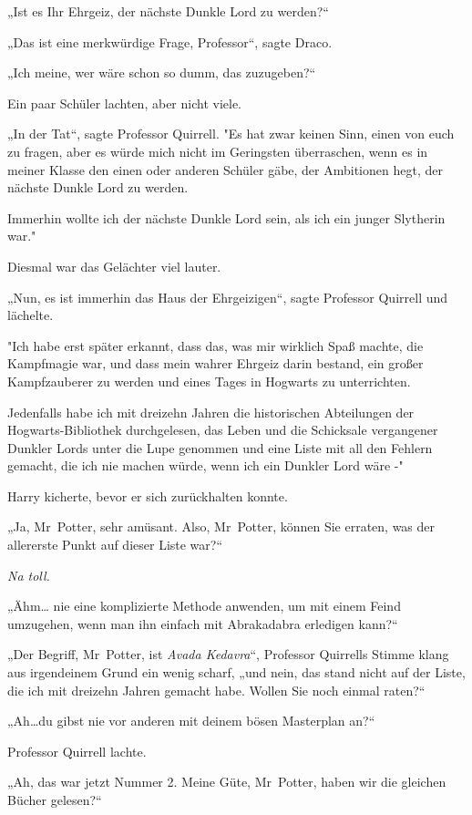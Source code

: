 {„Ist es Ihr Ehrgeiz, der nächste Dunkle Lord zu werden?“

„Das ist eine merkwürdige Frage, Professor“, sagte Draco.

„Ich meine, wer wäre schon so dumm, das zuzugeben?“

Ein paar Schüler lachten, aber nicht viele.

„In der Tat“, sagte Professor Quirrell. "Es hat zwar keinen Sinn, einen von euch zu fragen, aber es würde mich nicht im Geringsten überraschen, wenn es in meiner Klasse den einen oder anderen Schüler gäbe, der Ambitionen hegt, der nächste Dunkle Lord zu werden.

Immerhin wollte ich der nächste Dunkle Lord sein, als ich ein junger Slytherin war."

Diesmal war das Gelächter viel lauter.

„Nun, es ist immerhin das Haus der Ehrgeizigen“, sagte Professor Quirrell und lächelte.

"Ich habe erst später erkannt, dass das, was mir wirklich Spaß machte, die Kampfmagie war, und dass mein wahrer Ehrgeiz darin bestand, ein großer Kampfzauberer zu werden und eines Tages in Hogwarts zu unterrichten.

Jedenfalls habe ich mit dreizehn Jahren die historischen Abteilungen der Hogwarts-Bibliothek durchgelesen, das Leben und die Schicksale vergangener Dunkler Lords unter die Lupe genommen und eine Liste mit all den Fehlern gemacht, die ich nie machen würde, wenn ich ein Dunkler Lord wäre -"

Harry kicherte, bevor er sich zurückhalten konnte.

„Ja, Mr~Potter, sehr amüsant. Also, Mr~Potter, können Sie erraten, was der allererste Punkt auf dieser Liste war?“

\emph{Na toll.}

„Ähm… nie eine komplizierte Methode anwenden, um mit einem Feind umzugehen, wenn man ihn einfach mit Abrakadabra erledigen kann?“

„Der Begriff, Mr~Potter, ist \emph{Avada Kedavra}“, Professor Quirrells Stimme klang aus irgendeinem Grund ein wenig scharf, „und nein, das stand nicht auf der Liste, die ich mit dreizehn Jahren gemacht habe. Wollen Sie noch einmal raten?“

„Ah…du gibst nie vor anderen mit deinem bösen Masterplan an?“

Professor Quirrell lachte.

„Ah, das war jetzt Nummer 2. Meine Güte, Mr~Potter, haben wir die gleichen Bücher gelesen?“

}
